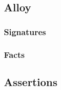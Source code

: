\newpage
\subsection{Alloy}
	\subsubsection{Signatures}
		
\newpage
	\subsubsection{Facts}
		
	\subsection{Assertions}
		